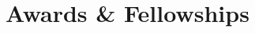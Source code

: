 \documentclass[letterpaper]{article}
\begin{document}
\section*{Awards \& Fellowships}
\end{document}
